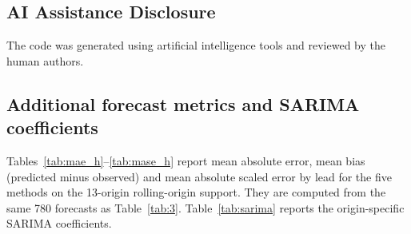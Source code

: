 \documentclass[pdflatex,sn-mathphys-ay,lineno]{sn-jnl}
\begin{document}
\subsection{AI Assistance Disclosure}

The code was generated using artificial intelligence tools and reviewed by the human authors.

\begin{appendices}
\renewcommand{\theHtable}{A\arabic{table}}

\section{Additional forecast metrics and SARIMA coefficients}\label{app:tables}

Tables~\ref{tab:mae_h}--\ref{tab:mase_h} report mean absolute error, mean bias (predicted minus observed) and mean absolute scaled error by lead for the five methods on the 13-origin rolling-origin support. They are computed from the same 780 forecasts as Table~\ref{tab:3}. Table~\ref{tab:sarima} reports the origin-specific SARIMA coefficients.


\end{appendices}
\end{document}
